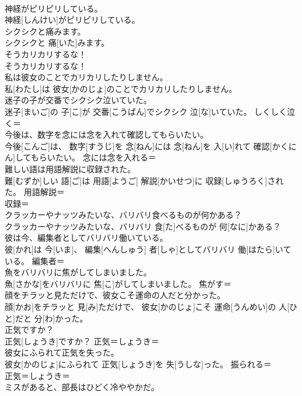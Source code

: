 \documentclass[8pt]{extreport}
\begin{document}
\begin{CJK}{UTF8}{min}
\\	神経がピリピリしている。	
\\	神経[しんけい]がピリピリしている。	
\\	シクシクと痛みます。	
\\	シクシクと 痛[いた]みます。	
\\	そうカリカリするな！	
\\	そうカリカリするな！	
\\	私は彼女のことでカリカリしたりしません。	
\\	私[わたし]は 彼女[かのじょ]のことでカリカリしたりしません。	
\\	迷子の子が交番でシクシク泣いていた。	
\\	迷子[まいご]の 子[こ]が 交番[こうばん]でシクシク 泣[な]いていた。	しくしく泣く＝ 
\\	今後は、数字を念には念を入れて確認してもらいたい。	
\\	今後[こんご]は、 数字[すうじ]を 念[ねん]には 念[ねん]を 入[い]れて 確認[かくにん]してもらいたい。	念には念を入れる＝ 
\\	難しい語は用語解説に収録された。	
\\	難[むずか]しい 語[ご]は 用語[ようご] 解説[かいせつ]に 収録[しゅうろく]された。	用語解説＝ 
\\	収録＝ 
\\	クラッカーやナッツみたいな、バリバリ食べるものが何かある？	
\\	クラッカーやナッツみたいな、バリバリ 食[た]べるものが 何[なに]かある？	
\\	彼は今、編集者としてバリバリ働いている。	
\\	彼[かれ]は 今[いま]、 編集[へんしゅう] 者[しゃ]としてバリバリ 働[はたら]いている。	編集者＝ 
\\	魚をバリバリに焦がしてしまいました。	
\\	魚[さかな]をバリバリに 焦[こ]がしてしまいました。	焦がす＝ 
\\	顔をチラッと見ただけで、彼女こそ運命の人だと分かった。	
\\	顔[かお]をチラッと 見[み]ただけで、 彼女[かのじょ]こそ 運命[うんめい]の 人[ひと]だと 分[わ]かった。	
\\	正気ですか？	
\\	正気[しょうき]ですか？	正気＝しょうき＝ 
\\	彼女にふられて正気を失った。	
\\	彼女[かのじょ]にふられて 正気[しょうき]を 失[うしな]った。	振られる＝ 
\\	正気＝しょうき＝ 
\\	ミスがあると、部長はひどく冷ややかだ。	

\end{CJK}
\end{document}

